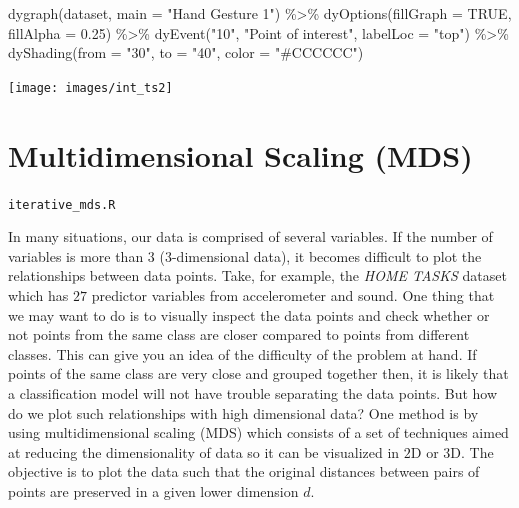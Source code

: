 \documentclass[
  11pt,
]{krantz}
\makeatletter
\newenvironment{Shaded}{\begin{snugshade}}{\end{snugshade}}
\newcommand{\AttributeTok}[1]{\textcolor[rgb]{0.61,0.61,0.61}{#1}}
\newcommand{\ConstantTok}[1]{\textcolor[rgb]{0,0,0}{#1}}
\newcommand{\FloatTok}[1]{\textcolor[rgb]{0.06,0.06,0.06}{#1}}
\newcommand{\FunctionTok}[1]{\textcolor[rgb]{0,0,0}{#1}}
\newcommand{\NormalTok}[1]{#1}
\newcommand{\SpecialCharTok}[1]{\textcolor[rgb]{0,0,0}{#1}}
\newcommand{\StringTok}[1]{\textcolor[rgb]{0.5,0.5,0.5}{#1}}
\newenvironment{kframe}{%
\medskip{}
\setlength{\fboxsep}{.8em}
 \def\at@end@of@kframe{}%
 \ifinner\ifhmode%
  \def\at@end@of@kframe{\end{minipage}}%
  \begin{minipage}{\columnwidth}%
 \fi\fi%
 \def\FrameCommand##1{\hskip\@totalleftmargin \hskip-\fboxsep
 \colorbox{shadecolor}{##1}\hskip-\fboxsep
     \hskip-\linewidth \hskip-\@totalleftmargin \hskip\columnwidth}%
 \MakeFramed {\advance\hsize-\width
   \@totalleftmargin\z@ \linewidth\hsize
   \@setminipage}}%
 {\par\unskip\endMakeFramed%
 \at@end@of@kframe}
\newenvironment{rmdblock}[1]
  {
  \begin{itemize}
  \renewcommand{\labelitemi}{
    \raisebox{-.7\height}[0pt][0pt]{
      {\setkeys{Gin}{width=3em,keepaspectratio}\texttt{[image: images/icons/\#1]}}
    }
  }
  \setlength{\fboxsep}{1em}
  \begin{kframe}
  \item
  }
  {
  \end{kframe}
  \end{itemize}
  }
\newenvironment{rmdfolder}
  {\begin{rmdblock}{folder}}
  {\end{rmdblock}}
\makeatother
\begin{document}
\begin{Shaded}
\begin{Highlighting}[]
\FunctionTok{dygraph}\NormalTok{(dataset, }\AttributeTok{main =} \StringTok{"Hand Gesture \textquotesingle{}1\textquotesingle{}"}\NormalTok{) }\SpecialCharTok{\%\textgreater{}\%}
  \FunctionTok{dyOptions}\NormalTok{(}\AttributeTok{fillGraph =} \ConstantTok{TRUE}\NormalTok{, }\AttributeTok{fillAlpha =} \FloatTok{0.25}\NormalTok{) }\SpecialCharTok{\%\textgreater{}\%}
  \FunctionTok{dyEvent}\NormalTok{(}\StringTok{"10"}\NormalTok{, }\StringTok{"Point of interest"}\NormalTok{, }\AttributeTok{labelLoc =} \StringTok{"top"}\NormalTok{) }\SpecialCharTok{\%\textgreater{}\%}
  \FunctionTok{dyShading}\NormalTok{(}\AttributeTok{from =} \StringTok{"30"}\NormalTok{, }\AttributeTok{to =} \StringTok{"40"}\NormalTok{, }\AttributeTok{color =} \StringTok{"\#CCCCCC"}\NormalTok{)}
\end{Highlighting}
\end{Shaded}

\begin{center}\texttt{[image: images/int\_ts2]} \end{center}

\hypertarget{multidimensional-scaling-mds}{%
\section{Multidimensional Scaling (MDS)}\label{multidimensional-scaling-mds}}

\begin{rmdfolder}
\texttt{iterative\_mds.R}
\end{rmdfolder}

In many situations, our data is comprised of several variables. If the number of variables is more than \(3\) (\(3\)-dimensional data), it becomes difficult to plot the relationships between data points. Take, for example, the \emph{HOME TASKS} dataset which has \(27\) predictor variables from accelerometer and sound. One thing that we may want to do is to visually inspect the data points and check whether or not points from the same class are closer compared to points from different classes. This can give you an idea of the difficulty of the problem at hand. If points of the same class are very close and grouped together then, it is likely that a classification model will not have trouble separating the data points. But how do we plot such relationships with high dimensional data? One method is by using multidimensional scaling (MDS) which consists of a set of techniques aimed at reducing the dimensionality of data so it can be visualized in \(2\)D or \(3\)D. The objective is to plot the data such that the original distances between pairs of points are preserved in a given lower dimension \(d\).
\end{document}
